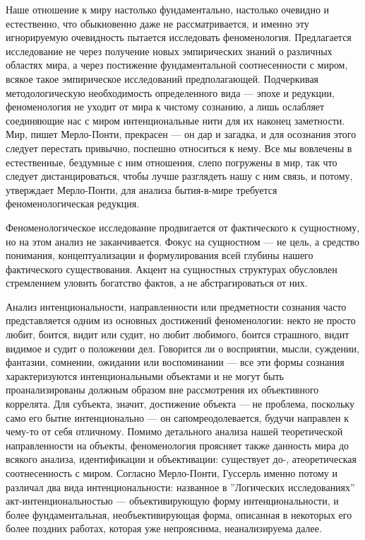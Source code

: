 \documentclass[11pt]{book}
\begin{document}
Наше отношение к миру настолько фундаментально, настолько очевидно и естественно, что обыкновенно даже не рассматривается, и именно эту игнорируемую очевидность пытается исследовать феноменология. Предлагается исследование не через получение новых эмпирических знаний о различных областях мира, а через постижение фундаментальной соотнесенности с миром, всякое такое эмпирическое исследований предполагающей. Подчеркивая методологическую необходимость определенного вида --- эпохе и редукции, феноменология не уходит от мира к чистому сознанию, а лишь ослабляет соединяющие нас с миром интенциональные нити для их наконец заметности. Мир, пишет Мерло-Понти, прекрасен --- он дар и загадка, и для осознания этого следует перестать привычно, поспешно относиться к нему. Все мы вовлечены в естественные, бездумные с ним отношения, слепо погружены в мир, так что следует дистанцироваться, чтобы лучше разглядеть нашу с ним связь, и потому, утверждает Мерло-Понти, для анализа бытия-в-мире требуется феноменологическая редукция.

Феноменологическое исследование продвигается от фактического к сущностному, но на этом анализ не заканчивается. Фокус на сущностном --- не цель, а средство понимания, концептуализации и формулирования всей глубины нашего фактического существования. Акцент на сущностных структурах обусловлен стремлением уловить богатство фактов, а не абстрагироваться от них.

Анализ интенциональности, направленности или предметности сознания часто представляется одним из основных достижений феноменологии: некто не просто любит, боится, видит или судит, но любит любимого, боится страшного, видит видимое и судит о положении дел. Говорится ли о восприятии, мысли, суждении, фантазии, сомнении, ожидании или воспоминании --- все эти формы сознания характеризуются интенциональными объектами и не могут быть проанализированы должным образом вне рассмотрения их объективного коррелята. Для субъекта, значит, достижение объекта --- не проблема, поскольку само его бытие интенционально --- он сапомреодолевается, будучи направлен к чему-то от себя отличному. Помимо детального анализа нашей теоретической направленности на объекты, феноменология проясняет также данность мира до всякого анализа, идентификации и объективации: существует до-, атеоретическая соотнесенность с миром. Согласно Мерло-Понти, Гуссерль именно потому и различал два вида интенциональности: названное в ''Логических исследованиях'' акт-интенциональностью --- объективирующую форму интенциональности, и более фундаментальная, необъективирующая форма, описанная в некоторых его более поздних работах, которая уже непрояснима, неанализируема далее.
\end{document}
